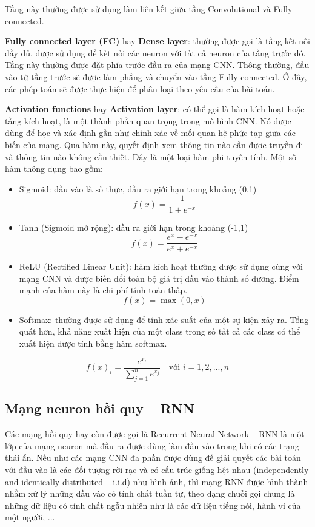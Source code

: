 \documentclass[12pt]{report}
\begin{document}
Tầng này thường được sử dụng làm liên kết giữa tầng Convolutional và Fully connected.

\textbf{Fully connected layer (FC)} hay \textbf{Dense layer}: thường được gọi là tầng kết nối đầy đủ, được sử dụng để kết nối các neuron với tất cả neuron của tầng trước đó. Tầng này thường được đặt phía trước đầu ra của mạng CNN. Thông thường, đầu vào từ tầng trước sẽ được làm phẳng và chuyển vào tầng Fully connected. Ở đây, các phép toán sẽ được thực hiện để phân loại theo yêu cầu của bài toán.

\textbf{Activation functions} hay \textbf{Activation layer}: có thể gọi là hàm kích hoạt hoặc tầng kích hoạt, là một thành phần quan trọng trong mô hình CNN. Nó được dùng để học và xác định gần như chính xác về mối quan hệ phức tạp giữa các biến của mạng. Qua hàm này, quyết định xem thông tin nào cần được truyền đi và thông tin nào không cần thiết. Đây là một loại hàm phi tuyến tính. Một số hàm thông dụng bao gồm:

\begin{itemize}
    \item Sigmoid: đầu vào là số thực, đầu ra giới hạn trong khoảng (0,1)
    \[
        f(x) = \frac{1}{1 + e^{-x}}
    \]
    
    \item Tanh (Sigmoid mở rộng): đầu ra giới hạn trong khoảng (-1,1)
    \[
        f(x) = \frac{e^x - e^{-x}}{e^x + e^{-x}}
    \]
    
    \item ReLU (Rectified Linear Unit): hàm kích hoạt thường được sử dụng cùng với mạng CNN và được biến đổi toàn bộ giá trị đầu vào thành số dương. Điểm mạnh của hàm này là chi phí tính toán thấp.
    \[
        f(x) = \max(0, x)
    \]
    
    \item Softmax: thường được sử dụng để tính xác suất của một sự kiện xảy ra. Tổng quát hơn, khả năng xuất hiện của một class trong số tất cả các class có thể xuất hiện được tính bằng hàm softmax.
\end{itemize}

\[
    f(x)_i = \frac{e^{x_i}}{\sum_{j=1}^n e^{x_j}} \quad \text{với } i = 1, 2, ..., n
\]

\subsection{Mạng neuron hồi quy – RNN}

Các mạng hồi quy hay còn được gọi là Recurrent Neural Network – RNN là một lớp của mạng neuron mà đầu ra được dùng làm đầu vào trong khi có các trạng thái ẩn. Nếu như các mạng CNN đa phần được dùng để giải quyết các bài toán với đầu vào là các đối tượng rời rạc và có cấu trúc giống hệt nhau (independently and identically distributed – i.i.d) như hình ảnh, thì mạng RNN được hình thành nhằm xử lý những đầu vào có tính chất tuần tự, theo dạng chuỗi gọi chung là những dữ liệu có tính chất ngẫu nhiên như là các dữ liệu tiếng nói, hành vi của một người, ...
\end{document}
